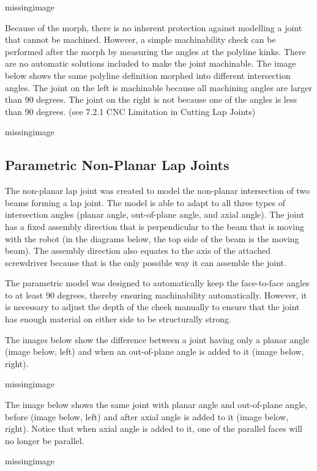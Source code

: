 missingimage

Because of the morph, there is no inherent protection against modelling a joint that cannot be machined. However, a simple machinability check can be performed after the morph by measuring the angles at the polyline kinks. There are no automatic solutions included to make the joint machinable. The image below shows the same polyline definition morphed into different intersection angles. The joint on the left is machinable because all machining angles are larger than 90 degrees. The joint on the right is not because one of the angles is less than 90 degrees. (see 7.2.1 CNC Limitation in Cutting Lap Joints)

missingimage

\subsection{Parametric Non-Planar Lap Joints}
\label{subsection:exploration_4_parametric_non_planar_lap_joints}

The non-planar lap joint was created to model the non-planar intersection of two beams forming a lap joint. The model is able to adapt to all three types of intersection angles (planar angle, out-of-plane angle, and axial angle). The joint has a fixed assembly direction that is perpendicular to the beam that is moving with the robot (in the diagrams below, the top side of the beam is the moving beam). The assembly direction also equates to the axis of the attached screwdriver because that is the only possible way it can assemble the joint.

The parametric model was designed to automatically keep the face-to-face angles to at least 90 degrees, thereby ensuring machinability automatically. However, it is necessary to adjust the depth of the cheek manually to ensure that the joint has enough material on either side to be structurally strong.

The images below show the difference between a joint having only a planar angle (image below, left) and when an out-of-plane angle is added to it (image below, right).

missingimage

The image below shows the same joint with planar angle and out-of-plane angle, before (image below, left) and after axial angle is added to it (image below, right). Notice that when axial angle is added to it, one of the parallel faces will no longer be parallel. 

missingimage

